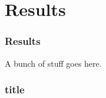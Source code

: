 \section{Results}

\begin{frame}
  \frametitle{Results}

  A bunch of stuff goes here.

\end{frame}

\begin{frame}
  \frametitle{title}
  
\end{frame}

